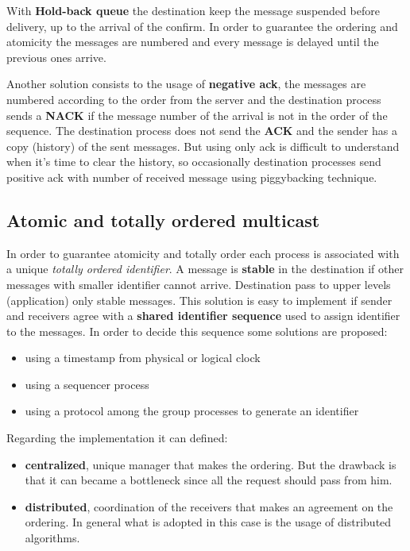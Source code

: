 \documentclass[11pt,a4paper]{article}
\begin{document}
With \textbf{Hold-back queue} the destination keep the message suspended before delivery, up to the arrival of the confirm. In order to guarantee the ordering and atomicity the messages are numbered and every message is delayed until the previous ones arrive.

Another solution consists to the usage of \textbf{negative ack}, the messages are numbered according to the order from the server and the destination process sends a \textbf{NACK} if the message number of the arrival is not in the order of the sequence. The destination process does not send the \textbf{ACK} and the sender has a copy (history) of the sent messages.
But using only ack is difficult to understand when it's time to clear the history, so occasionally destination processes send positive ack with number of received message using piggybacking technique.

\subsection{Atomic and totally ordered multicast}
In order to guarantee atomicity and totally order each process is associated with a unique \textit{totally ordered identifier}. A message is \textbf{stable} in the destination if other messages with smaller identifier cannot arrive. Destination pass to upper levels (application) only stable messages. This solution is easy to implement if sender and receivers agree with a \textbf{shared identifier sequence} used to assign identifier to the messages. In order to decide this sequence some solutions are proposed:
\begin{itemize}
	\item using a timestamp from physical or logical clock
	\item using a sequencer process
	\item using a protocol among the group processes to generate an identifier
\end{itemize}
Regarding the implementation it can defined:
\begin{itemize}
	\item \textbf{centralized}, unique manager that makes the ordering. But the drawback is that it can became a bottleneck since all the request should pass from him.
	\item \textbf{distributed}, coordination of the receivers that makes an agreement on the ordering. In general what is adopted in this case is the usage of distributed algorithms.
\end{itemize}
\end{document}

